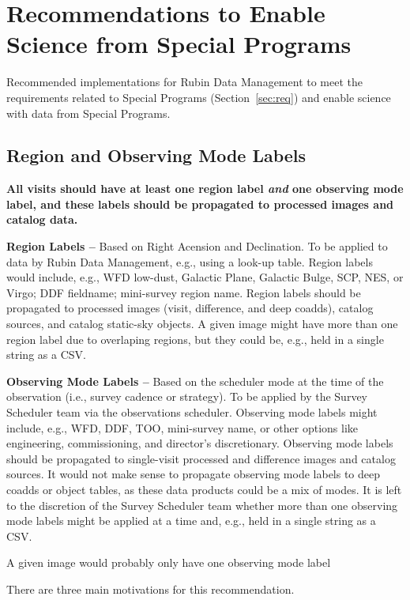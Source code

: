 \section{Recommendations to Enable Science from Special Programs}\label{sec:sci}

Recommended implementations for Rubin Data Management to meet the 
requirements related to Special Programs (Section~\ref{sec:req})
and enable science with data from Special Programs.

\subsection{Region and Observing Mode Labels}\label{ssec:sci_labels}

\textbf{All visits should have at least one region label \textit{and} one observing mode 
label, and these labels should be propagated to processed images and catalog data.}

\textbf{Region Labels -- } 
Based on Right Acension and Declination.
To be applied to data by Rubin Data Management, e.g., using a look-up table.
Region labels would include, e.g., WFD low-dust, Galactic Plane, Galactic 
Bulge, SCP, NES, or Virgo; DDF fieldname; mini-survey region name.
Region labels should be propagated to processed images (visit, 
difference, and deep coadds), catalog sources, and catalog static-sky objects.
A given image might have more than one region label due to overlaping regions,
but they could be, e.g., held in a single string as a CSV.

\textbf{Observing Mode Labels -- } 
Based on the scheduler mode at the time of the observation
(i.e., survey cadence or strategy).
To be applied by the Survey Scheduler team via the observations scheduler.
Observing mode labels might include, e.g., WFD, DDF, TOO, mini-survey name, or other 
options like engineering, commissioning, and director's discretionary.
Observing mode labels should be propagated to single-visit processed and 
difference images and catalog sources.
It would not make sense to propagate observing mode labels to deep coadds or 
object tables, as these data products could be a mix of modes.
It is left to the discretion of the Survey Scheduler team whether more than one
observing mode labels might be applied at a time and, e.g., held in a single string as a CSV.

A given image would probably only have one observing mode label


There are three main motivations for this recommendation.

